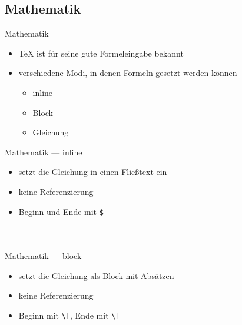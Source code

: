\documentclass[presentation,aspectratio=169]{beamer}
\begin{document}
\subsection{Mathematik}

\begin{frame}{Mathematik}
  \begin{itemize}
    \item \TeX{} ist für seine gute Formeleingabe bekannt
    \item verschiedene Modi, in denen Formeln gesetzt werden können
      \begin{itemize}
        \item inline
        \item Block
        \item Gleichung
      \end{itemize}
  \end{itemize}
\end{frame}

\begin{frame}[fragile]{Mathematik --- inline}
  \begin{itemize}
    \item setzt die Gleichung in einen Fließtext ein
    \item keine Referenzierung
    \item Beginn und Ende mit \verb|$|
  \end{itemize}
  
  \begin{columns}
    \begin{column}{.4\textwidth}
      
    \end{column}
    \begin{column}{.4\textwidth}
      \inputminted{latex}{codebeispiele/math-inline.tex}
    \end{column}
  \end{columns}
\end{frame}

\begin{frame}[fragile]{Mathematik --- block}
  \begin{itemize}
    \item setzt die Gleichung als Block mit Absätzen
    \item keine Referenzierung
    \item Beginn mit \verb|\[|, Ende mit \verb|\]|
  \end{itemize}
  
  \bigskip

  \begin{columns}
    \begin{column}{.4\textwidth}
      
    \end{column}
    \begin{column}{.4\textwidth}
      \inputminted{latex}{codebeispiele/math-block.tex}
    \end{column}
  \end{columns}
\end{frame}
\end{document}
